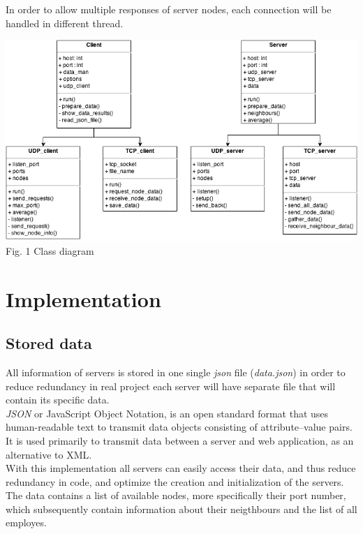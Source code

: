 \documentclass[12pt]{article}
\begin{document}
    In order to allow multiple responses of server nodes, each connection will be handled in different
    thread. 

    \begin{minipage}[b]{1.0\linewidth}
      \begin{center}
        \includegraphics[width=1.0\textwidth]{diagram}
         \\ Fig. 1 Class diagram
      \end{center}
    \end{minipage}
    




  \section{Implementation}

    \subsection{Stored data}

    All information of servers is stored in one single \textit{json} file (\textit{data.json}) in order to reduce redundancy in real project
    each server will have separate file that will contain its specific data.\\

    \textit{JSON} or JavaScript Object Notation, is an open standard format that uses human-readable text to transmit
    data objects consisting of attribute–value pairs. It is used primarily to transmit data between a server and web application, as an alternative to XML. \\

    With this implementation all servers can easily access their data, and thus reduce redundancy in code, and
    optimize the creation and initialization of the servers. The data contains a list of available nodes, more specifically their port number,
    which subsequently contain information about their neigthbours and the list of all employes. \\
\end{document}
